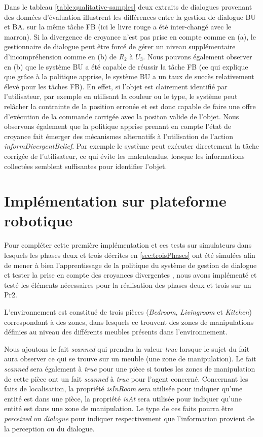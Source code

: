 \documentclass[a4paper,11pt,twoside]{StyleThese}
\begin{document}
%
Dans le tableau \ref{table:qualitative-samples} deux extraits de dialogues provenant des données d'évaluation illustrent les différences entre la gestion de dialogue BU et BA. sur la même tâche FB (ici le livre rouge a été inter-changé avec le marron). Si la divergence de croyance n'est pas prise en compte comme en (a), le gestionnaire de dialogue peut être forcé de gérer un niveau supplémentaire d'incompréhension comme en (b) de $R_2$ à $U_3$. 
Nous pouvons également observer en (b) que le système BU a été capable de réussir la tâche FB (ce qui explique que grâce à la politique apprise, le système BU a un taux de succès relativement élevé pour les tâches FB). En effet, si l'objet est clairement identifié par l'utilisateur, par exemple en utilisant la couleur ou le type, le système peut relâcher la contrainte de la position erronée et est donc capable de faire une offre d'exécution de la commande corrigée avec la positon valide de l'objet.
Nous observons également que la politique apprise prenant en compte l'état de croyance fait émerger des mécanismes alternatifs à l'utilisation de l'action \textit{informDivergentBelief}. Par exemple le système peut exécuter directement la tâche corrigée de l'utilisateur, ce qui évite les malentendus, lorsque les informations collectées semblent suffisantes pour identifier l'objet.



\section{Implémentation sur plateforme robotique}


Pour compléter cette première implémentation et ces tests sur simulateurs dans lesquels les phases deux et trois décrites en \ref{sec:troisPhases} ont été simulées afin de mener à bien l'apprentissage de la politique du système de gestion de dialogue \cite{simpar_2014} et tester la prise en compte des croyances divergentes \cite{Ferreira2015}, nous avons implémenté et testé les éléments nécessaires pour la réalisation des phases deux et trois sur un Pr2.

L'environnement est constitué de trois pièces (\textit{Bedroom}, \textit{Livingroom} et \textit{Kitchen}) correspondant à des zones, dans lesquels ce trouvent des zones de manipulations définies au niveau des différents meubles présents dans l'environnement.

Nous ajoutons le fait \textit{scanned} qui prendra la valeur \textit{true} lorsque 
le sujet du fait aura observer ce qui se trouve sur un meuble (une zone de manipulation). Le fait \textit{scanned} sera également à \textit{true} pour une pièce si toutes les zones de manipulation de cette pièce ont un fait \textit{scanned} à \textit{true} pour l'agent concerné.
Concernant les faits de localisation, la propriété \textit{isInRoom} sera utilisée pour indiquer qu'une entité est dans une pièce, la propriété \textit{isAt} sera utilisée pour indiquer qu'une entité est dans une zone de manipulation. Le type de ces faits pourra être \textit{perceived} ou \textit{dialogue} pour indiquer respectivement que l'information provient de la perception ou du dialogue.
\end{document}
